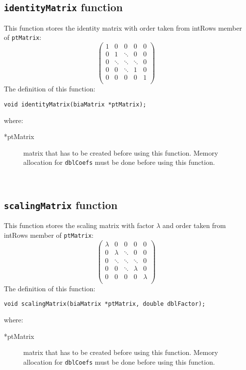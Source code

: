 \subsection{\texttt{identityMatrix} function}

This function stores the identity matrix with order taken from intRows member of \texttt{ptMatrix}:
%
\begin{displaymath}
  \left( \begin{array}{ccccc}
    1 & 0 & 0 & 0 & 0 \\
    0 & 1 & \ddots & 0 & 0 \\
    0 & \ddots & \ddots & \ddots & 0 \\
    0 & 0 & \ddots & 1 & 0 \\
    0 & 0 & 0 & 0 & 1 \\
  \end{array} \right)
\end{displaymath}
%
The definition of this function:
%
\begin{verbatim}
void identityMatrix(biaMatrix *ptMatrix);  
\end{verbatim}
%
where:
%
\begin{description}
\item[*ptMatrix] matrix that has to be created before using this function. Memory allocation for \texttt{dblCoefs} must be done before using this function.
\end{description}
%
\ \\
%

\subsection{\texttt{scalingMatrix} function}

This function stores the scaling matrix with factor $\lambda$ and order taken from intRows member of \texttt{ptMatrix}:
%
\begin{displaymath}
  \left( \begin{array}{ccccc}
    \lambda & 0 & 0 & 0 & 0 \\
    0 & \lambda & \ddots & 0 & 0 \\
    0 & \ddots & \ddots & \ddots & 0 \\
    0 & 0 & \ddots & \lambda & 0 \\
    0 & 0 & 0 & 0 & \lambda \\
  \end{array} \right)
\end{displaymath}
%
The definition of this function:
%
\begin{verbatim}
void scalingMatrix(biaMatrix *ptMatrix, double dblFactor);  
\end{verbatim}
%
where:
%
\begin{description}
\item[*ptMatrix] matrix that has to be created before using this function. Memory allocation for \texttt{dblCoefs} must be done before using this function.
\end{description}
%
\ \\
%


